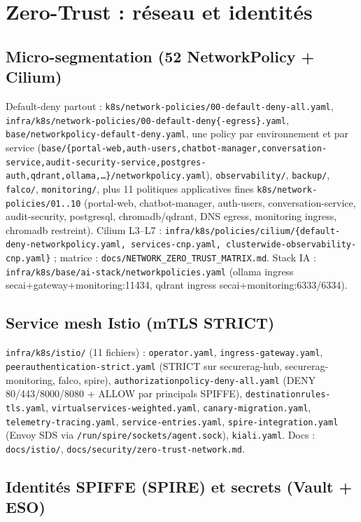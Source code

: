 \documentclass[12pt,a4paper,openany]{report}
\begin{document}
\section{Zero-Trust : réseau et identités}

\subsection{Micro-segmentation (52 NetworkPolicy + Cilium)}

Default-deny partout : \texttt{k8s/network-policies/00-default-deny-all.yaml},
\texttt{infra/k8s/network-policies/00-default-deny\{-egress\}.yaml},
\texttt{base/networkpolicy-default-deny.yaml}, une policy par environnement et par service
(\texttt{base/\{portal-web,auth-users,chatbot-manager,conversation-service,audit-security-service,postgres-auth,qdrant,ollama,\dots\}/networkpolicy.yaml}),
\texttt{observability/}, \texttt{backup/}, \texttt{falco/}, \texttt{monitoring/},
plus 11 politiques applicatives fines \texttt{k8s/network-policies/01..10}
(portal-web, chatbot-manager, auth-users, conversation-service, audit-security,
postgresql, chromadb/qdrant, DNS egress, monitoring ingress, chromadb restreint).
Cilium L3--L7 : \texttt{infra/k8s/policies/cilium/\{default-deny-networkpolicy.yaml,
services-cnp.yaml, clusterwide-observability-cnp.yaml\}} ;
matrice : \texttt{docs/NETWORK\_ZERO\_TRUST\_MATRIX.md}.
Stack IA : \texttt{infra/k8s/base/ai-stack/networkpolicies.yaml}
(ollama ingress secai+gateway+monitoring:11434, qdrant ingress secai+monitoring:6333/6334).

\subsection{Service mesh Istio (mTLS STRICT)}

\texttt{infra/k8s/istio/} (11 fichiers) : \texttt{operator.yaml},
\texttt{ingress-gateway.yaml}, \texttt{peerauthentication-strict.yaml}
(STRICT sur securerag-hub, securerag-monitoring, falco, spire),
\texttt{authorizationpolicy-deny-all.yaml} (DENY 80/443/8000/8080 + ALLOW par principals SPIFFE),
\texttt{destinationrules-tls.yaml}, \texttt{virtualservices-weighted.yaml},
\texttt{canary-migration.yaml}, \texttt{telemetry-tracing.yaml},
\texttt{service-entries.yaml}, \texttt{spire-integration.yaml} (Envoy SDS via
\texttt{/run/spire/sockets/agent.sock}), \texttt{kiali.yaml}.
Docs : \texttt{docs/istio/}, \texttt{docs/security/zero-trust-network.md}.

\subsection{Identités SPIFFE (SPIRE) et secrets (Vault + ESO)}
\end{document}
